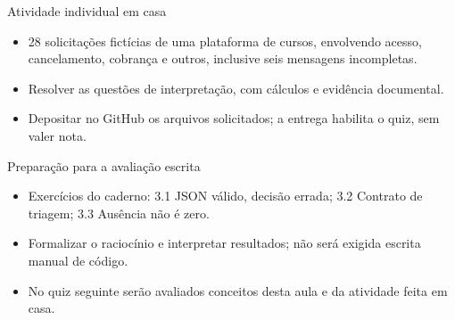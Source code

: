 \documentclass[10pt,aspectratio=169]{beamer}
\begin{document}
\begin{frame}[t]{Atividade individual em casa}
\small
\begin{itemize}
\item 28 solicitações fictícias de uma plataforma de cursos, envolvendo acesso, cancelamento, cobrança e outros, inclusive seis mensagens incompletas.
\item Resolver as questões de interpretação, com cálculos e evidência documental.
\item Depositar no GitHub os arquivos solicitados; a entrega habilita o quiz, sem valer nota.
\end{itemize}
\end{frame}

\begin{frame}[t]{Preparação para a avaliação escrita}
\small
\begin{itemize}
\item Exercícios do caderno: 3.1 JSON válido, decisão errada; 3.2 Contrato de triagem; 3.3 Ausência não é zero.
\item Formalizar o raciocínio e interpretar resultados; não será exigida escrita manual de código.
\item No quiz seguinte serão avaliados conceitos desta aula e da atividade feita em casa.
\end{itemize}
\end{frame}
\end{document}
